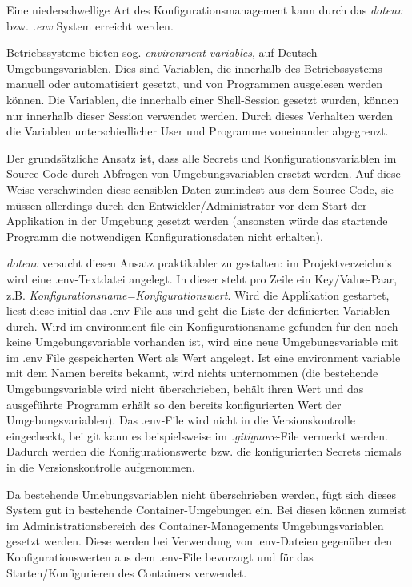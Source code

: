 Eine niederschwellige Art des Konfigurationsmanagement kann durch das \textit{dotenv} bzw. \textit{.env} System erreicht werden.

Betriebssysteme bieten sog. \textit{environment variables}, auf Deutsch Umgebungsvariablen. Dies sind Variablen, die innerhalb des Betriebssystems manuell oder automatisiert gesetzt, und von Programmen ausgelesen werden können. Die Variablen, die innerhalb einer Shell-Session gesetzt wurden, können nur innerhalb dieser Session verwendet werden. Durch dieses Verhalten werden die Variablen unterschiedlicher User und Programme voneinander abgegrenzt.

Der grundsätzliche Ansatz ist, dass alle Secrets und Konfigurationsvariablen im Source Code durch Abfragen von Umgebungsvariablen ersetzt werden. Auf diese Weise verschwinden diese sensiblen Daten zumindest aus dem Source Code, sie müssen allerdings durch den Entwickler/Administrator vor dem Start der Applikation in der Umgebung gesetzt werden (ansonsten würde das startende Programm die notwendigen Konfigurationsdaten nicht erhalten).

\textit{dotenv} versucht diesen Ansatz praktikabler zu gestalten: im Projektverzeichnis wird eine .env-Textdatei angelegt. In dieser steht pro Zeile ein Key/Value-Paar, z.B. \textit{Konfigurationsname=Konfigurationswert}. Wird die Applikation gestartet, liest diese initial das .env-File aus und geht die Liste der definierten Variablen durch. Wird im environment file ein Konfigurationsname gefunden für den noch keine Umgebungsvariable vorhanden ist, wird eine neue Umgebungsvariable mit im .env File gespeicherten Wert als Wert angelegt. Ist eine environment variable mit dem Namen bereits bekannt, wird nichts unternommen (die bestehende Umgebungsvariable wird nicht überschrieben, behält ihren Wert und das ausgeführte Programm erhält so den bereits konfigurierten Wert der Umgebungsvariablen). Das .env-File wird nicht in die Versionskontrolle eingecheckt, bei git kann es beispielsweise im \textit{.gitignore}-File vermerkt werden. Dadurch werden die Konfigurationswerte bzw. die konfigurierten Secrets niemals in die Versionskontrolle aufgenommen.

Da bestehende Umebungsvariablen nicht überschrieben werden, fügt sich dieses System gut in bestehende Container-Umgebungen ein. Bei diesen können zumeist im Administrationsbereich des Container-Managements Umgebungsvariablen gesetzt werden. Diese werden bei Verwendung von .env-Dateien gegenüber den Konfigurationswerten aus dem .env-File bevorzugt und für das Starten/Konfigurieren des Containers verwendet.

